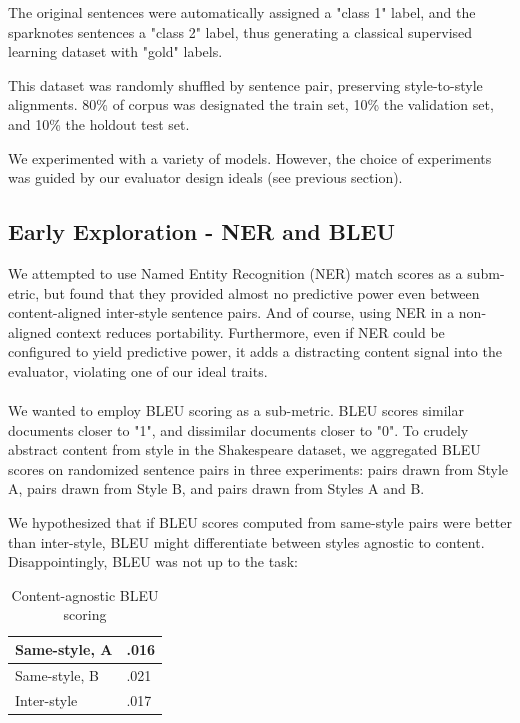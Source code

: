 \documentclass[letterpaper, 10 pt, conference]{ieeeconf}  %
\begin{document}
The original sentences were automatically assigned a "class 1" label, and the sparknotes sentences a "class 2" label, thus generating a classical supervised learning dataset with "gold" labels.

This dataset was randomly shuffled by sentence pair, preserving style-to-style alignments. 80\% of corpus was designated the train set, 10\% the validation set, and 10\% the holdout test set.
 
We experimented with a variety of models. However, the choice of experiments was guided by our evaluator design ideals (see previous section).

\subsection{Early Exploration - NER and BLEU}
We attempted to use Named Entity Recognition (NER) match scores as a subm-etric, but found that they provided almost no predictive power even between content-aligned inter-style sentence pairs. And of course, using NER in a non-aligned context reduces portability. Furthermore, even if NER could be configured to yield predictive power, it adds a distracting content signal into the evaluator, violating one of our ideal traits.
\\ \\
We wanted to employ BLEU scoring as a sub-metric. BLEU scores similar documents closer to "1", and dissimilar documents closer to "0". To crudely abstract content from style in the Shakespeare dataset, we aggregated BLEU scores on randomized sentence pairs in three experiments: pairs drawn from Style A, pairs drawn from Style B, and pairs drawn from Styles A and B.

We hypothesized that if BLEU scores computed from same-style pairs were better than inter-style, BLEU might differentiate between styles agnostic to content. Disappointingly, BLEU was not up to the task:

\begin{table}[h]
  \caption{Content-agnostic BLEU scoring}
  \label{table_example}
  \begin{center}
    \begin{tabular}{| p{2cm}  | p{2cm} |  }
    \hline
    Same-style, A & .016 \\
    \hline
    Same-style, B & .021\\
    \hline
    Inter-style & .017\\
    \hline
    \end{tabular}
  \end{center}
\end{table}
\end{document}

